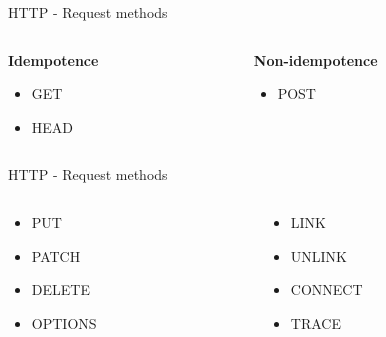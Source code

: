 \begin{frame}{HTTP - Request methods}
    \begin{columns}[t] %
         \begin{column}[T]{5cm} %
            \begin{center}
                \textbf{Idempotence}
                 \begin{itemize}
                     \item GET
                     \item HEAD
                 \end{itemize}
            \end{center}
         \end{column}
         \begin{column}[T]{5cm} %
            \begin{center}
                \textbf{Non-idempotence}
                 \begin{itemize}
                     \item POST
                 \end{itemize}
             \end{center}
         \end{column}
     \end{columns}
\end{frame}


\begin{frame}{HTTP - Request methods}
    \begin{columns}[t] %
         \begin{column}[T]{5cm} %
            \begin{center}
                 \begin{itemize}
                     \item PUT
                     \item PATCH
                     \item DELETE
                     \item OPTIONS
                 \end{itemize}
            \end{center}
         \end{column}
         \begin{column}[T]{5cm} %
            \begin{center}
                 \begin{itemize}
                     \item LINK
                     \item UNLINK
                     \item CONNECT
                     \item TRACE
                 \end{itemize}
             \end{center}
         \end{column}
     \end{columns}
 \end{frame}
